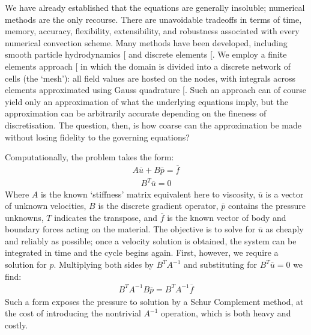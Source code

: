 \documentclass[letterpaper,10pt,english]{jupyterBook}
\begin{document}
\sphinxAtStartPar
We have already established that the equations are generally insoluble; numerical methods are the only recourse. There are unavoidable tradeoffs in terms of time, memory, accuracy, flexibility, extensibility, and robustness associated with every numerical convection scheme. Many methods have been developed, including smooth particle hydrodynamics {[}\sphinxcite{references:id58}{]} and discrete elements {[}\sphinxcite{references:id57}{]}. We employ a finite elements approach {[}\sphinxcite{references:id69}{]} in which the domain is divided into a discrete network of cells (the ‘mesh’): all field values are hosted on the nodes, with integrals across elements approximated using Gauss quadrature {[}\sphinxcite{references:id61}{]}. Such an approach can of course yield only an approximation of what the underlying equations imply, but the approximation can be arbitrarily accurate depending on the fineness of discretisation. The question, then, is how coarse can the approximation be made without losing fidelity to the governing equations?

\sphinxAtStartPar
Computationally, the problem takes the form:
\begin{equation*}
\begin{split} A \overline{u} + B \overline{p} = \overline{f} \end{split}
\end{equation*}\begin{equation*}
\begin{split} B^T \overline{u} = 0 \end{split}
\end{equation*}
\sphinxAtStartPar
Where \(A\) is the known ‘stiffness’ matrix equivalent here to viscosity, \(\overline{u}\) is a vector of unknown velocities, \(B\) is the discrete gradient operator, \(\overline{p}\) contains the pressure unknowns, \(T\) indicates the transpose, and \(\overline{f}\) is the known vector of body and boundary forces acting on the material. The objective is to solve for \(\overline{u}\) as cheaply and reliably as possible; once a velocity solution is obtained, the system can be integrated in time and the cycle begins again. First, however, we require a solution for \(p\). Multiplying both sides by \(B^TA^{-1}\) and substituting for \(B^T\overline{u}=0\) we find:
\begin{equation*}
\begin{split} B^T A^{-1} B \overline{p} = B^T A^{-1} \overline{f} \end{split}
\end{equation*}
\sphinxAtStartPar
Such a form exposes the pressure to solution by a Schur Complement method, at the cost of introducing the non\sphinxhyphen{}trivial \(A^{-1}\) operation, which is both heavy and costly.
\end{document}
